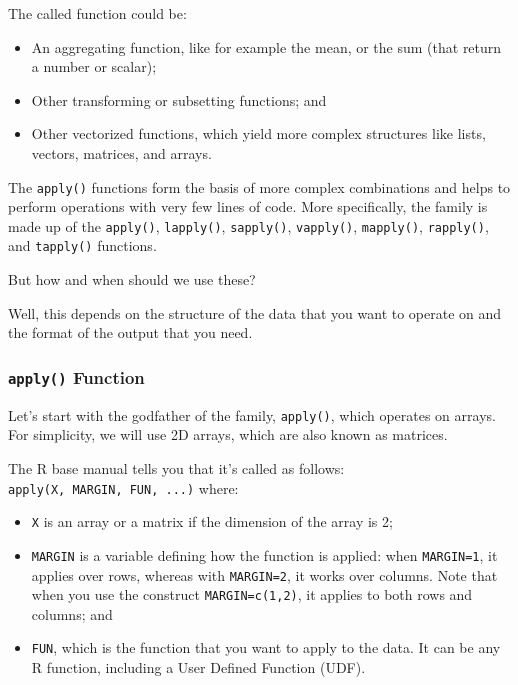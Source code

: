 \documentclass[
]{book}
\providecommand{\tightlist}{%
  \setlength{\itemsep}{0pt}\setlength{\parskip}{0pt}}
\theoremstyle{definition}
\theoremstyle{definition}
\theoremstyle{definition}
\theoremstyle{definition}
\theoremstyle{remark}
\begin{document}
The called function could be:

\begin{itemize}
\tightlist
\item
  An aggregating function, like for example the mean, or the sum (that return a number or scalar);
\item
  Other transforming or subsetting functions; and
\item
  Other vectorized functions, which yield more complex structures like lists, vectors, matrices, and arrays.
\end{itemize}

The \texttt{apply()} functions form the basis of more complex combinations and helps to perform operations with very few lines of code. More specifically, the family is made up of the \texttt{apply()}, \texttt{lapply()}, \texttt{sapply()}, \texttt{vapply()}, \texttt{mapply()}, \texttt{rapply()}, and \texttt{tapply()} functions.

But how and when should we use these?

Well, this depends on the structure of the data that you want to operate on and the format of the output that you need.

\hypertarget{apply-function}{%
\subsubsection{\texorpdfstring{\texttt{apply()} Function}{apply() Function}}\label{apply-function}}

Let's start with the godfather of the family, \texttt{apply()}, which operates on arrays. For simplicity, we will use 2D arrays, which are also known as matrices.

The R base manual tells you that it's called as follows: \texttt{apply(X,\ MARGIN,\ FUN,\ ...)} where:

\begin{itemize}
\tightlist
\item
  \texttt{X} is an array or a matrix if the dimension of the array is 2;
\item
  \texttt{MARGIN} is a variable defining how the function is applied: when \texttt{MARGIN=1}, it applies over rows, whereas with \texttt{MARGIN=2}, it works over columns. Note that when you use the construct \texttt{MARGIN=c(1,2)}, it applies to both rows and columns; and
\item
  \texttt{FUN}, which is the function that you want to apply to the data. It can be any R function, including a User Defined Function (UDF).
\end{itemize}
\end{document}
